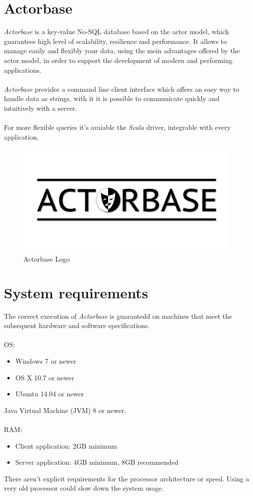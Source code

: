 \documentclass[a4paper]{article}
\begin{document}
	\section{Actorbase}
	\emph{Actorbase} is a key-value No-SQL database based on the actor model, which guarantees high level of scalability, resilience and performance. It allows to manage easily and flexibly your data, using the mein advantages offered by the actor model, in order to support the development of modern and performing applications.
	\\ \\
	\emph{Actorbase} provides a command line client interface which offers an easy way to handle data as strings, with it it is possible to communicate quickly and intuitively with a server.
	\\ \\
	For more flexible queries it's avaiable the \emph{Scala} driver, integrable with every application.
	\begin{figure}[H]
		\centering
		\includegraphics[scale=0.4]{actorbaseLogo.png}
		\caption{Actorbase Logo}
	\end{figure}

	\newpage



	\section{System requirements}	
	The correct execution of \emph{Actorbase} is guarantedd on machines that meet the subsequent hardware and software specifications.
	\\ \\
	OS:
	\begin{itemize}
		\item Windows 7 or newer
		\item OS X 10.7 or newer
		\item Ubuntu 14.04 or newer
	\end{itemize}
	Java Virtual Machine (JVM) 8 or newer.
	\\ \\
	RAM:
	\begin{itemize}
		\item Client application: 2GB minimum
		\item Server application: 4GB minimum, 8GB recommended
	\end{itemize}
	There aren't explicit requirements for the processor architecture or speed. Using a very old processor could slow down the system usage.
\end{document}
